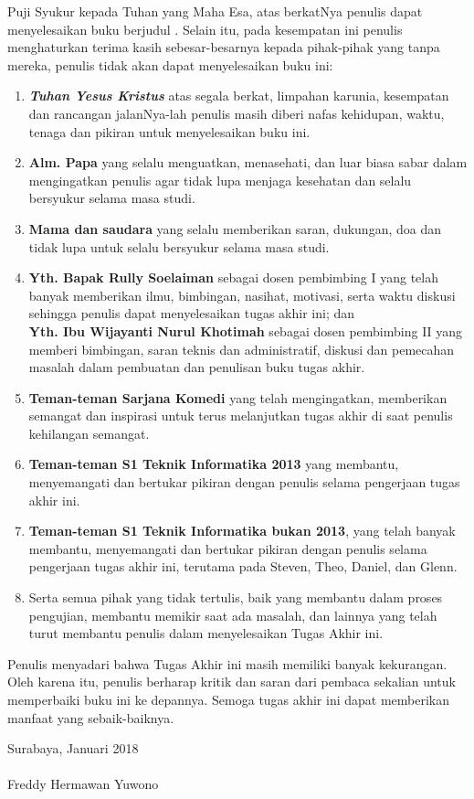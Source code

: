     
	  Puji Syukur kepada Tuhan yang Maha Esa, atas berkatNya penulis dapat menyelesaikan buku berjudul \textbf{\judul}. 
	  \newline
	  \indent Selain itu, pada kesempatan ini penulis menghaturkan terima kasih sebesar-besarnya kepada pihak-pihak yang tanpa mereka, penulis tidak akan dapat menyelesaikan buku ini:
  \begin{enumerate}
  	\item \textbf{\textit{Tuhan Yesus Kristus}} atas segala berkat, limpahan karunia, kesempatan dan rancangan jalanNya-lah penulis masih diberi nafas kehidupan, waktu, tenaga dan pikiran untuk menyelesaikan buku ini.
    \item \textbf{Alm. Papa} yang selalu menguatkan, menasehati, dan luar biasa sabar dalam mengingatkan penulis agar tidak lupa menjaga kesehatan dan selalu bersyukur selama masa studi.
    \item \textbf{Mama dan saudara} yang selalu memberikan saran, dukungan, doa dan tidak lupa untuk selalu bersyukur selama masa studi.
    \item \textbf{Yth. Bapak Rully Soelaiman} sebagai dosen pembimbing I yang telah banyak memberikan ilmu, bimbingan, nasihat, motivasi, serta waktu diskusi sehingga penulis dapat menyelesaikan tugas akhir ini; dan \\
	    \textbf{Yth. Ibu Wijayanti Nurul Khotimah} sebagai dosen pembimbing II yang memberi bimbingan, saran teknis dan administratif, diskusi dan pemecahan masalah dalam pembuatan dan penulisan buku tugas akhir.
    \item \textbf{Teman-teman Sarjana Komedi} yang telah mengingatkan, memberikan semangat dan inspirasi untuk terus melanjutkan tugas akhir di saat penulis kehilangan semangat.
    \item \textbf{Teman-teman S1 Teknik Informatika 2013} yang membantu, menyemangati dan bertukar pikiran dengan  penulis selama pengerjaan tugas akhir ini.
    \item \textbf{Teman-teman S1 Teknik Informatika bukan 2013}, yang telah banyak membantu, menyemangati dan bertukar pikiran dengan penulis selama pengerjaan tugas akhir ini, terutama pada Steven, Theo, Daniel, dan Glenn.
    \item Serta semua pihak yang tidak tertulis, baik yang membantu dalam proses pengujian, membantu memikir saat ada masalah, dan lainnya yang telah turut membantu penulis dalam menyelesaikan Tugas Akhir ini.
  \end{enumerate}
  
  \indent Penulis menyadari bahwa Tugas Akhir ini masih memiliki banyak kekurangan. Oleh karena itu, penulis berharap kritik dan saran dari pembaca sekalian untuk memperbaiki buku ini ke depannya. Semoga tugas akhir ini dapat memberikan manfaat yang sebaik-baiknya.

  \hfill Surabaya, Januari 2018 \\ \\ 


  \hfill Freddy Hermawan Yuwono

\cleardoublepage %

